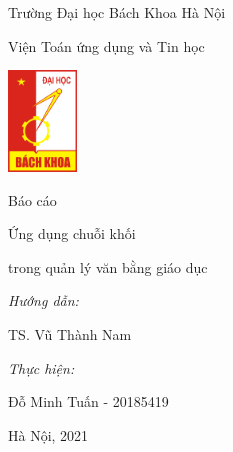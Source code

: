 \begin{titlepage}
    \centering
    \vspace{0.25cm}
    {\large Trường Đại học Bách Khoa Hà Nội\par}
    \vspace{0.25cm}
    {\normalsize Viện Toán ứng dụng và Tin học\par}
    \vspace{0.75cm}
    {\includegraphics[width=69px]{images/hust-logo.png}\par}
    \vspace{0.75cm}
    {\huge Báo cáo\par}
    \vspace{0.5cm}
    {\Large Ứng dụng chuỗi khối\par}
    \vspace{0.25cm}
    {\Large trong quản lý văn bằng giáo dục\par}
    \vspace{1cm}
    \begin{flushleft}
        \hspace{3cm}
        {\normalsize\textit{Hướng dẫn:}\par}
        \vspace{0.125cm}
        \hspace{5cm}
        {\normalsize TS. Vũ Thành Nam\par}
        \vspace{0.125cm}
        \hspace{3cm}
        {\normalsize\textit{Thực hiện:}\par}
        \vspace{0.125cm}
        \hspace{5cm}
        {\normalsize Đỗ Minh Tuấn - 20185419\par}
    \end{flushleft}
    \vspace{3cm}
    {\normalsize Hà Nội, 2021\par}
    \vspace{0.5cm}
\end{titlepage}